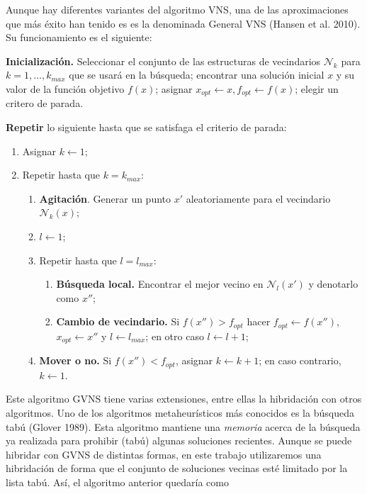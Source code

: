 \documentclass[
]{article}
\providecommand{\tightlist}{%
  \setlength{\itemsep}{0pt}\setlength{\parskip}{0pt}}
\begin{document}
Aunque hay diferentes variantes del algoritmo VNS, una de las
aproximaciones que más éxito han tenido es es la denominada General VNS
(Hansen et al. 2010). Su funcionamiento es el siguiente:

\textbf{Inicialización.} Seleccionar el conjunto de las estructuras de
vecindarios \(\mathcal{N}_k\) para \(k=1,\ldots, k_{max}\) que se usará
en la búsqueda; encontrar una solución inicial \(x\) y su valor de la
función objetivo \(f(x)\); asignar
\(x_{opt}\leftarrow x, f_{opt}\leftarrow f(x)\); elegir un critero de
parada.

\textbf{Repetir} lo siguiente hasta que se satisfaga el criterio de
parada:

\begin{enumerate}
\def\labelenumi{(\arabic{enumi})}
\tightlist
\item
  Asignar \(k\leftarrow 1\);
\item
  Repetir hasta que \(k=k_{max}\):

  \begin{enumerate}
  \def\labelenumii{(\alph{enumii})}
  \tightlist
  \item
    \textbf{Agitación}. Generar un punto \(x'\) aleatoriamente para el
    vecindario \(\mathcal{N}_k(x)\);
  \item
    \(l\leftarrow 1\);
  \item
    Repetir hasta que \(l=l_{max}\):

    \begin{enumerate}
    \def\labelenumiii{(\roman{enumiii})}
    \tightlist
    \item
      \textbf{Búsqueda local.} Encontrar el mejor vecino en
      \(\mathcal{N}_l(x')\) y denotarlo como \(x''\);
    \item
      \textbf{Cambio de vecindario.} Si \(f(x'') > f_{opt}\) hacer
      \(f_{opt}\leftarrow f(x'')\), \(x_{opt}\leftarrow x''\) y
      \(l\leftarrow l_{max}\); en otro caso \(l\leftarrow l + 1\);
    \end{enumerate}
  \item
    \textbf{Mover o no.} Si \(f(x'') < f_{opt}\), asignar
    \(k \leftarrow k + 1\); en caso contrario, \(k\leftarrow 1\).
  \end{enumerate}
\end{enumerate}

Este algoritmo GVNS tiene varias extensiones, entre ellas la hibridación
con otros algoritmos. Uno de los algoritmos metaheurísticos más
conocidos es la búsqueda tabú (Glover 1989). Esta algoritmo mantiene una
\emph{memoria} acerca de la búsqueda ya realizada para prohibir (tabú)
algunas soluciones recientes. Aunque se puede hibridar con GVNS de
distintas formas, en este trabajo utilizaremos una hibridación de forma
que el conjunto de soluciones vecinas esté limitado por la lista tabú.
Así, el algoritmo anterior quedaría como
\end{document}
